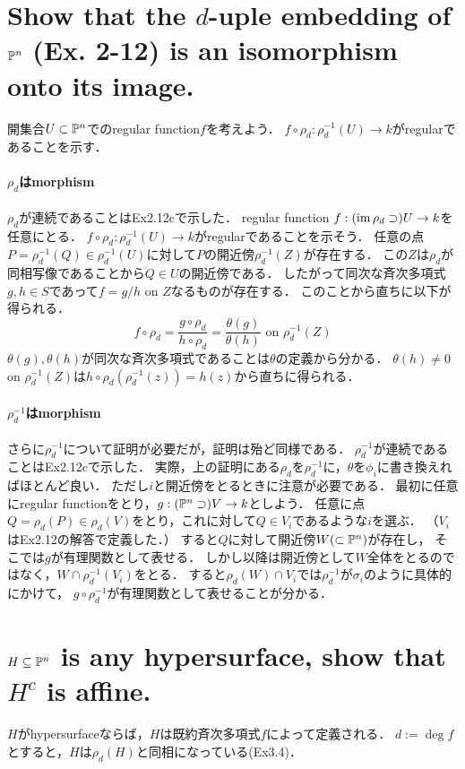 \documentclass[a4paper]{jsarticle}
\begin{document}
\section{Show that the $d$-uple embedding of $\mathbb{P}^n$ (Ex. 2-12) is an isomorphism onto its image.} %
    開集合$U \subset \mathbb{P}^n$でのregular function$f$を考えよう．
    $f \circ \rho_d: \rho_d^{-1}(U) \to k$がregularであることを示す．

    \paragraph{$\rho_d$はmorphism}
    $\rho_d$が連続であることはEx2.12cで示した．
    regular function $f: (\operatorname{im} \rho_d \supset) U  \to k$を任意にとる．
    $f \circ \rho_d: \rho_d^{-1}(U) \to k$がregularであることを示そう．
    任意の点$P=\rho_d^{-1}(Q) \in \rho_d^{-1}(U)$に対して$P$の開近傍$\rho_d^{-1}(Z)$が存在する．
    この$Z$は$\rho_d$が同相写像であることから$Q \in U$の開近傍である．
    したがって同次な斉次多項式$g,h \in S$であって$f=g/h \mbox{ on } Z$なるものが存在する．
    このことから直ちに以下が得られる．
    \[ f \circ \rho_d=\frac{g \circ \rho_d}{h \circ \rho_d}=\frac{\theta(g)}{\theta(h)} \mbox{ on } \rho_d^{-1}(Z) \]
    $\theta(g), \theta(h)$が同次な斉次多項式であることは$\theta$の定義から分かる．
    $\theta(h) \neq 0$ on $\rho_d^{-1}(Z)$は$h \circ \rho_d(\rho_d^{-1}(z))=h(z)$から直ちに得られる．

    \paragraph{$\rho_d^{-1}$はmorphism}
    さらに$\rho_d^{-1}$について証明が必要だが，証明は殆ど同様である．
    $\rho_d^{-1}$が連続であることはEx2.12cで示した．
    実際，上の証明にある$\rho_d$を$\rho_d^{-1}$に，$\theta$を$\phi_i$に書き換えればほとんど良い．
    ただし$i$と開近傍をとるときに注意が必要である．
    最初に任意にregular functionをとり，$g: (\mathbb{P}^n \supset) V \to k$としよう．
    任意に点$Q=\rho_d(P) \in \rho_d(V)$をとり，これに対して$Q \in V_i$であるような$i$を選ぶ．
    （$V_i$はEx2.12の解答で定義した．）
    すると$Q$に対して開近傍$W( \subset \mathbb{P}^n)$が存在し，
    そこでは$g$が有理関数として表せる．
    しかし以降は開近傍として$W$全体をとるのではなく，$W \cap \rho_d^{-1}(V_i)$をとる．
    すると$\rho_d(W) \cap V_i$では$\rho_d^{-1}$が$\sigma_i$のように具体的にかけて，
    $g \circ \rho_d^{-1}$が有理関数として表せることが分かる．

\section{$H \subseteq \mathbb{P}^n$ is any hypersurface, show that $H^c$ is affine.} %
    $H$がhypersurfaceならば，$H$は既約斉次多項式$f$によって定義される．
    $d:=\deg f$とすると，$H$は$\rho_d(H)$と同相になっている(Ex3.4)．
\end{document}
